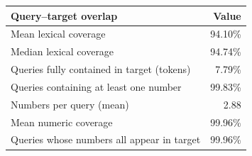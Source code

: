 \begin{tabular}{lr}
\toprule
\textbf{Query--target overlap} & \textbf{Value} \\
\midrule
Mean lexical coverage & 94.10\% \\
Median lexical coverage & 94.74\% \\
Queries fully contained in target (tokens) & 7.79\% \\
\midrule
Queries containing at least one number & 99.83\% \\
Numbers per query (mean) & 2.88 \\
Mean numeric coverage & 99.96\% \\
Queries whose numbers all appear in target & 99.96\% \\
\bottomrule
\end{tabular}
